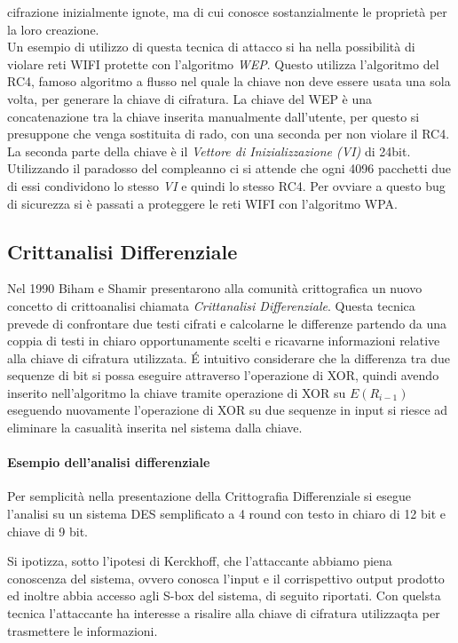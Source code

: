 \documentclass[11pt, a4paper, oneside]{Thesis} %
\begin{document}
\begin{itemize}
 cifrazione inizialmente ignote, ma di cui conosce sostanzialmente le proprietà per la loro creazione. 
 \\ Un esempio di utilizzo di questa tecnica di attacco si ha nella possibilità di violare reti WIFI protette con l'algoritmo \textit{WEP}. 
 Questo utilizza l'algoritmo del RC4, famoso algoritmo a flusso nel quale la chiave non deve essere usata una sola volta, per generare la chiave di cifratura.
 La chiave del WEP è una concatenazione tra la chiave inserita manualmente dall'utente, per questo si presuppone che venga sostituita di rado, con una seconda per non
 violare il RC4. La seconda parte della chiave è il \textit{Vettore di Inizializzazione (VI)} di 24bit. Utilizzando il paradosso del compleanno ci si attende che ogni 4096 pacchetti 
 due di essi condividono lo stesso \textit{VI} e quindi lo stesso RC4. Per ovviare a questo bug di sicurezza si è passati a proteggere le reti WIFI con l'algoritmo WPA.
\end{itemize}
\subsection{Crittanalisi Differenziale}
Nel 1990 Biham e Shamir presentarono alla comunità crittografica un nuovo concetto di crittoanalisi chiamata \emph{Crittanalisi Differenziale}.
Questa tecnica prevede di confrontare due testi cifrati e calcolarne le differenze partendo da una coppia di testi in chiaro opportunamente scelti e ricavarne informazioni relative
alla chiave di cifratura utilizzata. \'E intuitivo considerare che la differenza tra due sequenze di bit si possa eseguire attraverso l'operazione di XOR, quindi avendo inserito
nell'algoritmo la chiave tramite operazione di XOR su $E(R_{i-1})$ eseguendo nuovamente l'operazione di XOR su due sequenze in input si riesce ad eliminare la casualità inserita nel 
sistema dalla chiave.

\paragraph{Esempio dell'analisi differenziale} Per semplicità nella presentazione della Crittografia Differenziale si esegue l'analisi su un sistema DES semplificato a 4 round con testo
in chiaro di 12 bit e chiave di 9 bit. 
\par Si ipotizza, sotto l'ipotesi di Kerckhoff, che l'attaccante abbiamo piena conoscenza del sistema, ovvero conosca l'input e il corrispettivo output prodotto 
ed inoltre abbia accesso agli S-box del sistema, di seguito riportati.
Con quelsta tecnica l'attaccante ha interesse a risalire alla chiave di cifratura utilizzaqta per trasmettere le informazioni.
\end{document}
